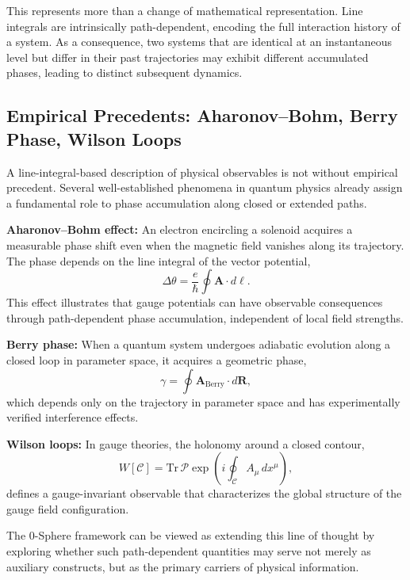 \documentclass[12pt,letterpaper]{article}
\begin{document}
This represents more than a change of mathematical representation. Line integrals are intrinsically path-dependent, encoding the full interaction history of a system. As a consequence, two systems that are identical at an instantaneous level but differ in their past trajectories may exhibit different accumulated phases, leading to distinct subsequent dynamics.

\subsection{Empirical Precedents: Aharonov--Bohm, Berry Phase, Wilson Loops}
\label{subsec:empirical_precedents}

A line-integral-based description of physical observables is not without empirical precedent. Several well-established phenomena in quantum physics already assign a fundamental role to phase accumulation along closed or extended paths.

\textbf{Aharonov--Bohm effect:} An electron encircling a solenoid acquires a measurable phase shift even when the magnetic field vanishes along its trajectory. The phase depends on the line integral of the vector potential,
\begin{equation}
\Delta \theta = \frac{e}{\hbar} \oint \bm{A} \cdot d\bm{\ell}.
\end{equation}
This effect illustrates that gauge potentials can have observable consequences through path-dependent phase accumulation, independent of local field strengths.

\textbf{Berry phase:} When a quantum system undergoes adiabatic evolution along a closed loop in parameter space, it acquires a geometric phase,
\begin{equation}
\gamma = \oint \bm{A}_{\mathrm{Berry}} \cdot d\bm{R},
\end{equation}
which depends only on the trajectory in parameter space and has experimentally verified interference effects.

\textbf{Wilson loops:} In gauge theories, the holonomy around a closed contour,
\begin{equation}
W[\mathcal{C}] = \mathrm{Tr}\, \mathcal{P} \exp\!\left( i \oint_{\mathcal{C}} A_\mu \, dx^\mu \right),
\end{equation}
defines a gauge-invariant observable that characterizes the global structure of the gauge field configuration.

The 0-Sphere framework can be viewed as extending this line of thought by exploring whether such path-dependent quantities may serve not merely as auxiliary constructs, but as the primary carriers of physical information.
\end{document}
